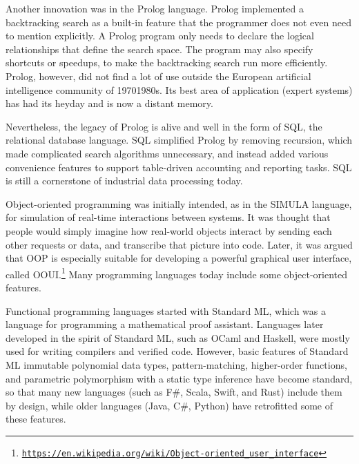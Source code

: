 Another innovation was in the Prolog language. Prolog implemented
a backtracking search as a built-in feature that the programmer does
not even need to mention explicitly. A Prolog program only needs to
declare the logical relationships that define the search space. The
program may also specify shortcuts or speedups, to make the backtracking
search run more efficiently. Prolog, however, did not find a lot of
use outside the European artificial intelligence community of 1970\textendash 1980s.
Its best area of application (expert systems) has had its heyday and
is now a distant memory.

Nevertheless, the legacy of Prolog is alive and well in the form of
SQL, the relational database language. SQL simplified Prolog by removing
recursion, which made complicated search algorithms unnecessary, and
instead added various convenience features to support table-driven
accounting and reporting tasks. SQL is still a cornerstone of industrial
data processing today.

Object-oriented programming was initially intended, as in the SIMULA
language, for simulation of real-time interactions between systems.
It was thought that people would simply imagine how real-world objects
interact by sending each other requests or data, and transcribe that
picture into code. Later, it was argued that OOP is especially suitable
for developing a powerful graphical user interface, called OOUI.\footnote{\texttt{\href{https://en.wikipedia.org/wiki/Object-oriented_user_interface}{https://en.wikipedia.org/wiki/Object-oriented\_user\_interface}}}
Many programming languages today include some object-oriented features.

Functional programming languages started with Standard ML, which was
a language for programming a mathematical proof assistant. Languages
later developed in the spirit of Standard ML, such as OCaml and Haskell,
were mostly used for writing compilers and verified code. However,
basic features of Standard ML \textemdash{} immutable polynomial data
types, pattern-matching, higher-order functions, and parametric polymorphism
with a static type inference \textemdash{} have become standard, so
that many new languages (such as F\#, Scala, Swift, and Rust) include
them by design, while older languages (Java, C\#, Python) have retrofitted
some of these features. 


